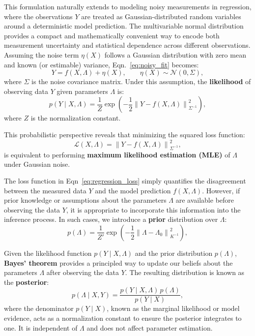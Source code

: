 \documentclass[12pt]{article}
\begin{document}
This formulation naturally extends to modeling noisy measurements in regression, where the observations \( Y \) are treated as Gaussian-distributed random variables around a deterministic model prediction. The multivariable normal distribution provides a compact and mathematically convenient way to encode both measurement uncertainty and statistical dependence across different observations. Assuming the noise term \( \eta(X) \) follows a Gaussian distribution with zero mean and known (or estimable) variance, Eqn.~\eqref{eq:noisy_fit} becomes:
\begin{equation}
    Y = f(X, \Lambda) + \eta(X), \qquad \eta(X) \sim \mathcal{N}(0, \Sigma),
\end{equation}
where \( \Sigma \) is the noise covariance matrix. 
Under this assumption, the \textbf{likelihood} of observing data \( Y \) given parameters \( \Lambda \) is:
\begin{equation}
    p(Y \mid X, \Lambda) = \frac{1}{Z} \exp\left( -\frac{1}{2} \left\lVert Y - f(X, \Lambda) \right\rVert_{\Sigma^{-1}}^2 \right),
    \label{likelihood}
\end{equation}
where \( Z \) is the normalization constant.

This probabilistic perspective reveals that minimizing the squared loss function:
\begin{equation}
    \mathcal{L}(X, \Lambda) = \left\lVert Y - f(X, \Lambda) \right\rVert_{\Sigma^{-1}}^2,
    \label{eq:regression_loss}
\end{equation}
is equivalent to performing \textbf{maximum likelihood estimation (MLE)} of \(\Lambda\) under Gaussian noise. 

The loss function in Eqn~\eqref{eq:regression_loss} simply quantifies the disagreement between the measured data \( Y \) and the model prediction \( f(X, \Lambda) \). However, if prior knowledge or assumptions about the parameters \( \Lambda \) are available before observing the data \( Y \), it is appropriate to incorporate this information into the inference process. In such cases, we introduce a \textbf{prior} distribution over \( \Lambda \):
\begin{equation}
    p(\Lambda) = \frac{1}{Z'} \exp\left( -\frac{1}{2} \left\lVert \Lambda - \Lambda_0 \right\rVert_{K^{-1}}^2 \right),
    \label{eq:prior}
\end{equation}

Given the likelihood function \( p(Y \mid X, \Lambda) \) and the prior distribution \( p(\Lambda) \), \textbf{Bayes' theorem} provides a principled way to update our beliefs about the parameters \( \Lambda \) after observing the data \( Y \). The resulting distribution is known as the \textbf{posterior}:
\begin{equation}
    p(\Lambda \mid X, Y) = \frac{p(Y \mid X, \Lambda) \, p(\Lambda)}{p(Y \mid X)},
    \label{eq:bayes}
\end{equation}
where the denominator \( p(Y \mid X) \), known as the marginal likelihood or model evidence, acts as a normalization constant to ensure the posterior integrates to one. It is independent of \( \Lambda \) and does not affect parameter estimation.
\end{document}
